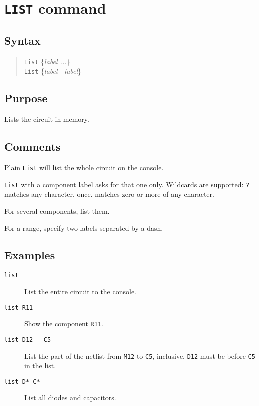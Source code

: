 \section{{\tt LIST} command}
\subsection{Syntax}
\begin{verse}
{\tt List} \{{\it label ...}\} \\
{\tt List} \{{\it label} - {\it label}\}
\end{verse}
\subsection{Purpose}

Lists the circuit in memory.
\subsection{Comments}

Plain {\tt List} will list the whole circuit on the console.

{\tt List} with a component label asks for that one only.  Wildcards are
supported: {\tt ?} matches any character, once.  {\tt *} matches zero or
more of any character.

For several components, list them.

For a range, specify two labels separated by a dash.
\subsection{Examples}

\begin{description}

\item[{\tt list}] List the entire circuit to the console.

\item[{\tt list R11}] Show the component {\tt R11}.

\item[{\tt list D12 - C5}] List the part of the netlist from {\tt M12} to
{\tt C5}, inclusive.  {\tt D12} must be before {\tt C5} in the list.

\item[{\tt list D* C*}] List all diodes and capacitors.

\end{description}
